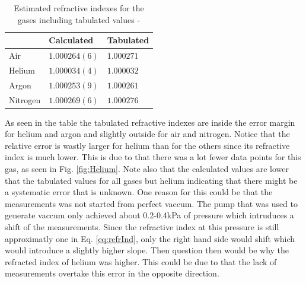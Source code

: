 \begin{table}[H]
  \centering
  \caption{Estimated refractive indexes for the gases including tabulated values \cite{idxAir}-\cite{idxNit}}
  \label{tab:refrIndex}
  \begin{tabular}{l|l|l}%
          & Calculated & Tabulated  \\ \hline %
    Air      & $1.000264(6)$  & $1.000271$  \\ %
    Helium   & $1.000034(4)$  & $1.000032$  \\ %
    Argon    & $1.000253(9)$  & $1.000261$  \\ %
    Nitrogen & $1.000269(6)$  & $1.000276$  \\ %
  \end{tabular}
\end{table}

As seen in the table the tabulated refractive indexes are inside the error margin for helium and argon and slightly outside for air and nitrogen. Notice that the relative error is wastly larger for helium than for the others since its refractive index is much lower. This is due to that there was a lot fewer data points for this gas, as seen in Fig. \ref{fig:Helium}. Note also that the calculated values are lower that the tabulated values for all gases but helium indicating that there might be a systematic error that is unknown. One reason for this could be that the measurements was not started from perfect vaccum. The pump that was used to generate vaccum only achieved about 0.2-0.4kPa of pressure which intruduces a shift of the measurements. Since the refractive index at this pressure is still approximatly one in Eq. \ref{eq:refrInd}, only the right hand side would shift which would introduce a slightly higher slope. Then question then would be why the refracted index of helium was higher. This could be due to that the lack of measurements overtake this error in the opposite direction.

